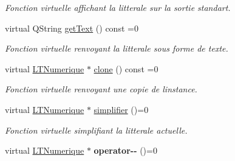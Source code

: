 \begin{DoxyCompactItemize}
\begin{DoxyCompactList}\small\item\em Fonction virtuelle affichant la litterale sur la sortie standart. \end{DoxyCompactList}\item 
virtual Q\+String \hyperlink{class_l_t_numerique_abef28b1b62ee356717f70f4317a44590}{get\+Text} () const  =0
\begin{DoxyCompactList}\small\item\em Fonction virtuelle renvoyant la litterale sous forme de texte. \end{DoxyCompactList}\item 
virtual \hyperlink{class_l_t_numerique}{L\+T\+Numerique} $\ast$ \hyperlink{class_l_t_numerique_a884056443dd30cd71c49b42b5ba63581}{clone} () const  =0
\begin{DoxyCompactList}\small\item\em Fonction virtuelle renvoyant une copie de l\textquotesingle{}instance. \end{DoxyCompactList}\item 
virtual \hyperlink{class_l_t_numerique}{L\+T\+Numerique} $\ast$ \hyperlink{class_l_t_numerique_a3963de62916188d01f93b1d0fdb42c7f}{simplifier} ()=0
\begin{DoxyCompactList}\small\item\em Fonction virtuelle simplifiant la litterale actuelle. \end{DoxyCompactList}\item 
virtual \hyperlink{class_l_t_numerique}{L\+T\+Numerique} $\ast$ {\bfseries operator-\/-\/} ()=0\hypertarget{class_l_t_numerique_ac3b8e78546185c08c3ed82e1ca16689d}{}\label{class_l_t_numerique_ac3b8e78546185c08c3ed82e1ca16689d}


\end{DoxyCompactItemize}
